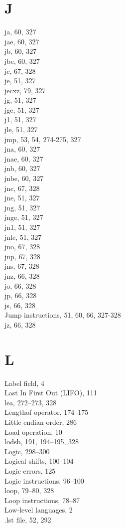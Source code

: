 \documentclass[10pt]{book}
\begin{document}
\section{J}
ja, 60, 327\\
jae, 60, 327\\
jb, 60, 327\\
jbe, 60, 327\\
jc, 67, 328\\
je, 51, 327\\
jecxz, 79, 327\\
jg, 51, 327\\
jge, 51, 327\\
j1, 51, 327\\
jle, 51, 327\\
jmp, 53, 54, 274-275, 327\\
jna, 60, 327\\
jnae, 60, 327\\
jnb, 60, 327\\
jnbe, 60, 327\\
jnc, 67, 328\\
jne, 51, 327\\
jng, 51, 327\\
jnge, 51, 327\\
jn1, 51, 327\\
jnle, 51, 327\\
jno, 67, 328\\
jnp, 67, 328\\
jns, 67, 328\\
jnz, 66, 328\\
jo, 66, 328\\
jp, 66, 328\\
js, 66, 328\\
Jump instructions, 51, 60, 66, 327-328\\
jz, 66, 328

\section{L}
Label field, 4\\
Last In First Out (LIFO), 111\\
lea, 272--273, 328\\
Lengthof operator, 174--175\\
Little endian order, 286\\
Load operation, 10\\
lodsb, 191, 194--195, 328\\
Logic, 298--300\\
Logical shifts, 100--104\\
Logic errors, 125\\
Logic instructions, 96--100\\
loop, 79--80, 328\\
Loop instructions, 78--87\\
Low-level languages, 2\\
.lst file, 52, 292\\
\end{document}
